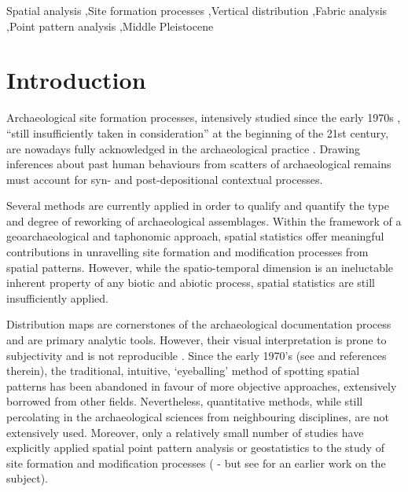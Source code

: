 \documentclass[preprint,authoryear,times]{elsarticle} %
\begin{document}
\begin{frontmatter}
  \begin{keyword}
    Spatial analysis \sep Site formation processes \sep Vertical distribution \sep Fabric analysis \sep Point pattern analysis \sep Middle Pleistocene
  \end{keyword}
  
\end{frontmatter}

\linenumbers

\section{Introduction}

Archaeological site formation processes, intensively studied since the early 1970s \citep[][among others]{Isaac1967,Schiffer1972,Schiffer1983,Schiffer1987,Shackley1978,Wood1978,Binford1981,Schick1984,Schick1986,Schick1987,Petraglia1987,Petraglia1994}, ``still insufficiently taken in consideration'' \citep[][p.379]{Texier2000} at the beginning of the 21st century, are nowadays fully acknowledged in the archaeological practice \citep[][among others]{Villa2004,Bailey2007,Brantingham2007,Malinsky-Buller2011,Vaquero2012,Bargallo2016}. Drawing inferences about past human behaviours from scatters of archaeological remains must account for syn- and post-depositional contextual processes.

Several methods are currently applied in order to qualify and quantify the type and degree of reworking of archaeological assemblages. Within the framework of a geoarchaeological and taphonomic approach, spatial statistics offer meaningful contributions in unravelling site formation and modification processes from spatial patterns. However, while the spatio-temporal dimension is an ineluctable inherent property of any biotic and abiotic process, spatial statistics are still insufficiently applied.

Distribution maps are cornerstones of the archaeological documentation process and are primary analytic tools. However, their visual interpretation is prone to subjectivity and is not reproducible \citep{Bevan2013a}. Since the early 1970's (see \cite{Hodder1976,Orton1982} and references therein), the traditional, intuitive, `eyeballing' method of spotting spatial patterns has been abandoned in favour of more objective approaches, extensively borrowed from other fields. Nevertheless, quantitative methods, while still percolating in the archaeological sciences from neighbouring disciplines, are not extensively used. Moreover, only a relatively small number of studies have explicitly applied spatial point pattern analysis or geostatistics to the study of site formation and modification processes (\cite{Lenoble2008,Dominguez-Rodrigo2014b,Dominguez-Rodrigo2014c,Dominguez-Rodrigo2017,Carrer2015,Giusti2016,Organista2017} - but see \cite{Hivernel1984} for an earlier work on the subject).
\end{document}
